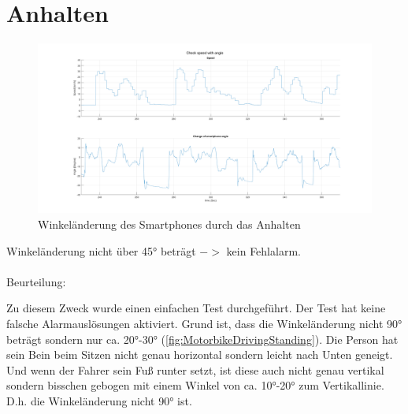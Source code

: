 \section{Anhalten}

\begin{figure}[H]
	\centering
	\includegraphics[width=\linewidth]{Bilder/Speed_AngleChangeCompare.png}
	\caption{Winkeländerung des Smartphones durch das Anhalten}
	\label{fig:Speed_AngleChangeCompare}
\end{figure}
Winkeländerung nicht über \ang{45} beträgt $->$ kein Fehlalarm.\\
\\
Beurteilung:

Zu diesem Zweck wurde einen einfachen Test durchgeführt. Der Test hat keine falsche Alarmauslösungen aktiviert. Grund ist, dass die Winkeländerung nicht \ang{90} beträgt sondern nur ca. \ang{20}-\ang{30} (\autoref{fig:MotorbikeDrivingStanding}). Die Person hat sein Bein beim Sitzen nicht genau horizontal sondern leicht nach Unten geneigt. Und wenn der Fahrer sein Fuß runter setzt, ist diese auch nicht genau vertikal sondern bisschen gebogen mit einem Winkel von ca. \ang{10}-\ang{20} zum Vertikallinie. D.h. die Winkeländerung nicht \ang{90} ist.

